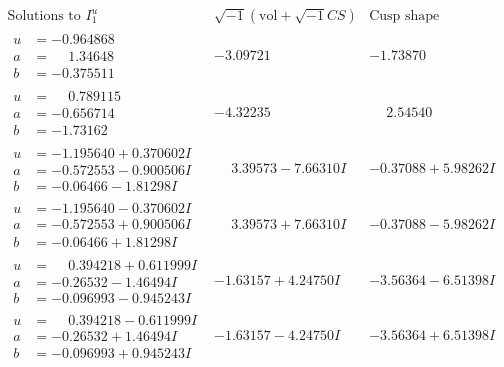 \documentclass[1p]{elsarticle_modified}
\theoremstyle{definition}
\newcommand{\I}{\sqrt{-1}}
\begin{document}
$$\begin{array}{c|c|c}  
\text{Solutions to }I^u_{1}& \I (\text{vol} + \sqrt{-1}CS) & \text{Cusp shape}\\
 \hline 
\begin{aligned}
u &= -0.964868\phantom{ +0.000000I} \\
a &= \phantom{-}1.34648\phantom{ +0.000000I} \\
b &= -0.375511\phantom{ +0.000000I}\end{aligned}
 & -3.09721\phantom{ +0.000000I} & -1.73870\phantom{ +0.000000I} \\ \hline\begin{aligned}
u &= \phantom{-}0.789115\phantom{ +0.000000I} \\
a &= -0.656714\phantom{ +0.000000I} \\
b &= -1.73162\phantom{ +0.000000I}\end{aligned}
 & -4.32235\phantom{ +0.000000I} & \phantom{-}2.54540\phantom{ +0.000000I} \\ \hline\begin{aligned}
u &= -1.195640 + 0.370602 I \\
a &= -0.572553 - 0.900506 I \\
b &= -0.06466 - 1.81298 I\end{aligned}
 & \phantom{-}3.39573 - 7.66310 I & -0.37088 + 5.98262 I \\ \hline\begin{aligned}
u &= -1.195640 - 0.370602 I \\
a &= -0.572553 + 0.900506 I \\
b &= -0.06466 + 1.81298 I\end{aligned}
 & \phantom{-}3.39573 + 7.66310 I & -0.37088 - 5.98262 I \\ \hline\begin{aligned}
u &= \phantom{-}0.394218 + 0.611999 I \\
a &= -0.26532 - 1.46494 I \\
b &= -0.096993 - 0.945243 I\end{aligned}
 & -1.63157 + 4.24750 I & -3.56364 - 6.51398 I \\ \hline\begin{aligned}
u &= \phantom{-}0.394218 - 0.611999 I \\
a &= -0.26532 + 1.46494 I \\
b &= -0.096993 + 0.945243 I\end{aligned}
 & -1.63157 - 4.24750 I & -3.56364 + 6.51398 I \\ \hline\begin{aligned}

\end{aligned}
\end{array}$$
\end{document}
